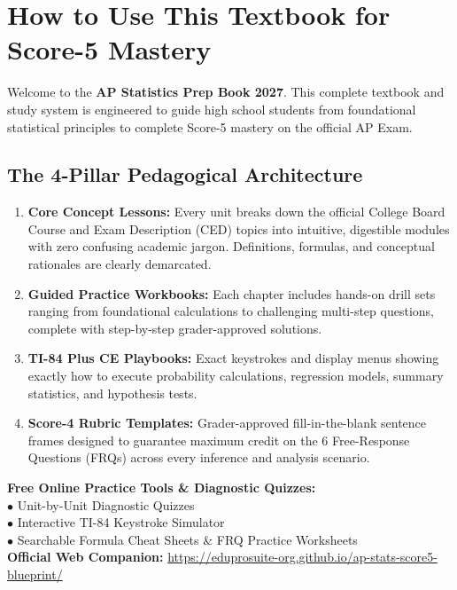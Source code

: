 \tableofcontents
\clearpage

\chapter*{How to Use This Textbook for Score-5 Mastery}

Welcome to the \textbf{AP Statistics Prep Book 2027}. This complete textbook and study system is engineered to guide high school students from foundational statistical principles to complete Score-5 mastery on the official AP Exam.

\section*{The 4-Pillar Pedagogical Architecture}
\begin{enumerate}[leftmargin=1.5em]
  \item \textbf{Core Concept Lessons:} Every unit breaks down the official College Board Course and Exam Description (CED) topics into intuitive, digestible modules with zero confusing academic jargon. Definitions, formulas, and conceptual rationales are clearly demarcated.
  \item \textbf{Guided Practice Workbooks:} Each chapter includes hands-on drill sets ranging from foundational calculations to challenging multi-step questions, complete with step-by-step grader-approved solutions.
  \item \textbf{TI-84 Plus CE Playbooks:} Exact keystrokes and display menus showing exactly how to execute probability calculations, regression models, summary statistics, and hypothesis tests.
  \item \textbf{Score-4 Rubric Templates:} Grader-approved fill-in-the-blank sentence frames designed to guarantee maximum credit on the 6 Free-Response Questions (FRQs) across every inference and analysis scenario.
\end{enumerate}

\begin{center}
\begin{tcolorbox}[standard jigsaw,width=0.95\linewidth,colback=NavyBlue!5!white,colframe=NavyBlue,title=\textbf{FREE DIGITAL WEB COMPANION PORTAL}]
\begin{minipage}{0.95\linewidth}
  \textbf{Free Online Practice Tools \& Diagnostic Quizzes:}\\
  $\bullet$ Unit-by-Unit Diagnostic Quizzes\\
  $\bullet$ Interactive TI-84 Keystroke Simulator\\
  $\bullet$ Searchable Formula Cheat Sheets \& FRQ Practice Worksheets\\[6pt]
  \textbf{Official Web Companion:} \url{https://eduprosuite-org.github.io/ap-stats-score5-blueprint/}
\end{minipage}
\end{tcolorbox}
\end{center}

